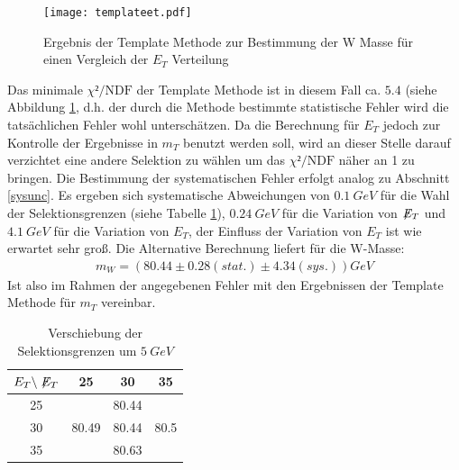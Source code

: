 \documentclass[a4paper,12pt]{article}
\newcommand{\met}{\ensuremath{\not\mathrel{E}}_T}
\begin{document}

\begin{figure}[htb]
	\centering
	\texttt{[image: templateet.pdf]}
	\caption{Ergebnis der Template Methode zur Bestimmung der W Masse für einen Vergleich der $E_{T}$ Verteilung}
	\label{fig:chiet}
\end{figure}
Das minimale $χ²/\text{NDF}$ der Template Methode ist in diesem Fall ca. $5.4$ (siehe Abbildung \ref{fig:chiet}, d.h. der durch die Methode bestimmte statistische Fehler wird
die tatsächlichen Fehler wohl unterschätzen. Da die Berechnung für $E_{T}$ jedoch zur Kontrolle der Ergebnisse in $m_{T}$ benutzt werden soll,
wird an dieser Stelle darauf verzichtet eine andere Selektion zu wählen um das $χ²/\text{NDF}$ näher an 1 zu bringen. Die Bestimmung der systematischen Fehler erfolgt analog zu
Abschnitt \ref{sysunc}. Es ergeben sich systematische Abweichungen von $\SI{0.1}{GeV}$ für die Wahl der Selektionsgrenzen (siehe Tabelle \ref{tab:variation_et}), $\SI{0.24}{GeV}$
für die Variation von $\met$ und $\SI{4.1}{GeV}$ für die Variation von $E_{T}$, der Einfluss der Variation von $E_{T}$ ist wie erwartet sehr groß.
Die Alternative Berechnung liefert für die W-Masse:
\begin{align*}
	m_W = ( 80.44 ± 0.28 (stat.)± 4.34 (sys.)) \si{GeV}
\end{align*}
Ist also im Rahmen der angegebenen Fehler mit den Ergebnissen der Template Methode für $m_{T}$ vereinbar. 
\begin{table}[h]
	\centering
	\begin{tabular}{c| c c c}
		$E_{T} \backslash \met$ & 25 & 30 & 35 \\
		\hline
		25 &  & 80.44 & \\
		30 & 80.49 & 80.44 & 80.5 \\
		35 &  & 80.63 &
	\end{tabular}
	\caption{Verschiebung der Selektionsgrenzen um $\SI{5}{GeV}$}
	\label{tab:variation_et}
\end{table}
\end{document}
